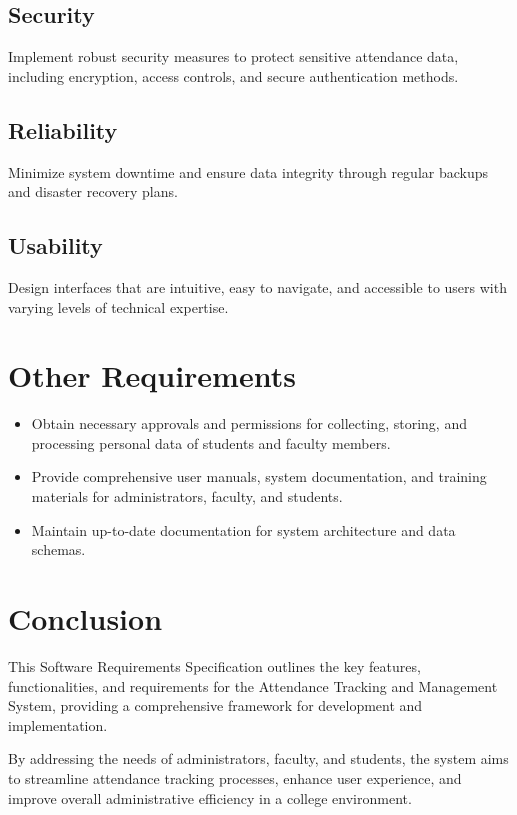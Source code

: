 \documentclass{article}
\begin{document}
\subsection*{\Large{Security}}
\begin{large}
Implement robust security measures to protect sensitive attendance data, including encryption, access controls, and secure authentication methods.
\end{large}

\subsection*{\Large{Reliability}}
\begin{large}
Minimize system downtime and ensure data integrity through regular backups and disaster recovery plans.
\end{large}

\subsection*{\Large{Usability}}
\begin{large}
Design interfaces that are intuitive, easy to navigate, and accessible to users with varying levels of technical expertise.
\end{large}

\section*{\huge{Other Requirements}}
\begin{large}
\begin{itemize}[label={--}]
    \item Obtain necessary approvals and permissions for collecting, storing, and processing personal data of students and faculty members.
    \item Provide comprehensive user manuals, system documentation, and training materials for administrators, faculty, and students.
    \item Maintain up-to-date documentation for system architecture and data schemas.
\end{itemize}
\end{large}

\section*{\Large{Conclusion}} 
\begin{large}
This Software Requirements Specification outlines the key features, functionalities, and requirements for the Attendance Tracking and Management System, providing a comprehensive framework for development and implementation. 
\vspace*{0.4cm}
\begin{flushleft}
By addressing the needs of administrators, faculty, and students, the system aims to streamline attendance tracking processes, enhance user experience, and improve overall administrative efficiency in a college environment.
\end{flushleft}
\end{large}
\end{document}
